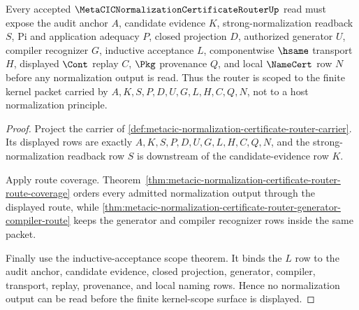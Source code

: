 \begin{theorem}
\label{thm:metacic-normalization-certificate-router-kernel-scope}
Every accepted $\MetaCICNormalizationCertificateRouterUp$ read must expose the audit anchor $A$, candidate evidence $K$, strong-normalization readback $S$, Pi and application adequacy $P$, closed projection $D$, authorized generator $U$, compiler recognizer $G$, inductive acceptance $L$, componentwise $\hsame$ transport $H$, displayed $\Cont$ replay $C$, $\Pkg$ provenance $Q$, and local $\NameCert$ row $N$ before any normalization output is read. Thus the router is scoped to the finite kernel packet carried by $A,K,S,P,D,U,G,L,H,C,Q,N$, not to a host normalization principle.
\end{theorem}
\begin{proof}
Project the carrier of \autoref{def:metacic-normalization-certificate-router-carrier}. Its displayed rows are exactly $A,K,S,P,D,U,G,L,H,C,Q,N$, and the strong-normalization readback row $S$ is downstream of the candidate-evidence row $K$.

Apply route coverage. Theorem~\ref{thm:metacic-normalization-certificate-router-route-coverage} orders every admitted normalization output through the displayed route, while \autoref{thm:metacic-normalization-certificate-router-generator-compiler-route} keeps the generator and compiler recognizer rows inside the same packet.

Finally use the inductive-acceptance scope theorem. It binds the $L$ row to the audit anchor, candidate evidence, closed projection, generator, compiler, transport, replay, provenance, and local naming rows. Hence no normalization output can be read before the finite kernel-scope surface is displayed.
\end{proof}

